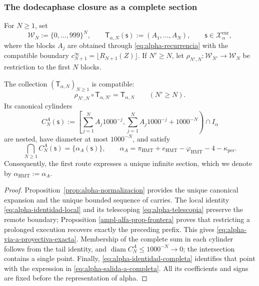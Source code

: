 \subsubsection{The dodecaphase closure as a complete section}

For \(N\geq1\), set
\[
 \mathcal W_N:=\{0,\ldots,999\}^{N},
 \qquad
 \mathsf T_{\alpha,N}(\mathsf s):=(A_1,\ldots,A_N),
 \qquad \mathsf s\in\mathcal X_{\alpha}^{\mathrm{enr}},
\]
where the blocks \(A_j\) are obtained through
\eqref{eq:alpha-recurrencia} with the compatible boundary
\(c_{N+1}^{\infty}=\lfloor R_{N+1}(Z)\rfloor\). If \(N'\geq N\), let
\(\rho_{N',N}:\mathcal W_{N'}\to\mathcal W_N\) be restriction to the first
\(N\) blocks.

\begin{theorem}
\label{thm:alpha-salida-dodecafasica-completa}
The collection \((\mathsf T_{\alpha,N})_{N\geq1}\) is compatible:
\begin{equation}
 \rho_{N',N}\circ\mathsf T_{\alpha,N'}
 =\mathsf T_{\alpha,N}
 \qquad(N'\geq N).
 \label{eq:alpha-via-a-proyectiva-exacta}
\end{equation}
Its canonical cylinders
\begin{equation}
 C_N^A(\mathsf s):=
 \left[
  \sum_{j=1}^{N}A_j1000^{-j},
  \sum_{j=1}^{N}A_j1000^{-j}+1000^{-N}
 \right)\cap I_\alpha
 \label{eq:alpha-cilindros-via-a-exactos}
\end{equation}
are nested, have diameter at most \(1000^{-N}\), and satisfy
\begin{equation}
 \bigcap_{N\geq1}C_N^A(\mathsf s)
 =\{\alpha_A(\mathsf s)\},
 \qquad
 \alpha_A
 =\pi_{\mathrm{HMT}}+e_{\mathrm{HMT}}-\varphi_{\mathrm{HMT}}
  -4-\kappa_{\mathrm{per}}.
 \label{eq:alpha-salida-a-completa}
\end{equation}
Consequently, the first route expresses a unique infinite section, which we
denote by \(\alpha_{\mathrm{HMT}}:=\alpha_A\).
\end{theorem}

\begin{proof}
Proposition~\ref{prop:alpha-normalizacion} provides the unique canonical
expansion and the unique bounded sequence of carries. The local identity
\eqref{eq:alpha-identidad-local} and its telescoping
\eqref{eq:alpha-telescopia} preserve the remote boundary; Proposition
\ref{ampl-alfa-prop-frontera} proves that restricting a prolonged execution
recovers exactly the preceding prefix. This gives
\eqref{eq:alpha-via-a-proyectiva-exacta}. Membership of the complete sum in
each cylinder follows from the tail identity, and
\(\operatorname{diam}C_N^A\leq1000^{-N}\to0\); the intersection contains a
single point. Finally, \eqref{eq:alpha-identidad-completa} identifies that
point with the expression in \eqref{eq:alpha-salida-a-completa}. All its
coefficients and signs are fixed before the representation of alpha.
\end{proof}

